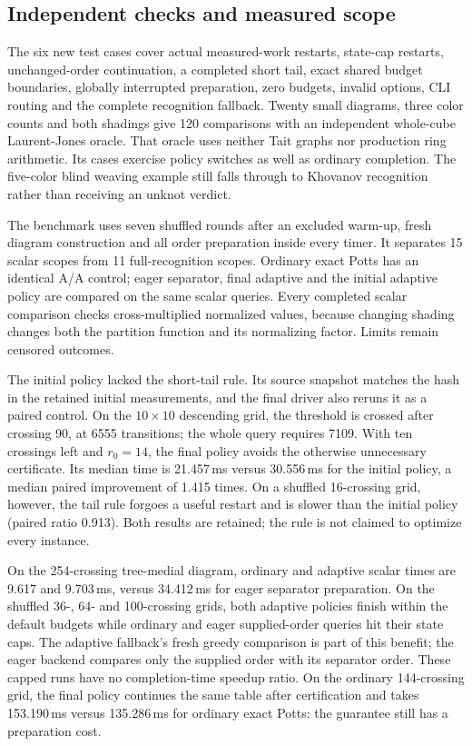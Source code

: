 \subsection{Independent checks and measured scope}

The six new test cases cover actual measured-work restarts, state-cap
restarts, unchanged-order continuation, a completed short tail, exact shared
budget boundaries, globally interrupted preparation, zero budgets, invalid
options, CLI routing and the complete recognition fallback.  Twenty small
diagrams, three color counts and both shadings give 120 comparisons with an
independent whole-cube Laurent-Jones oracle.  That oracle uses neither Tait
graphs nor production ring arithmetic.  Its cases exercise policy switches
as well as ordinary completion.  The five-color blind weaving example still
falls through to Khovanov recognition rather than receiving an unknot verdict.

The benchmark uses seven shuffled rounds after an excluded warm-up, fresh
diagram construction and all order preparation inside every timer.  It
separates 15 scalar scopes from 11 full-recognition scopes.  Ordinary exact
Potts has an identical A/A control; eager separator, final adaptive and the
initial adaptive policy are compared on the same scalar queries.  Every
completed scalar comparison checks cross-multiplied normalized values,
because changing shading changes both the partition function and its
normalizing factor.  Limits remain censored outcomes.

The initial policy lacked the short-tail rule.  Its source snapshot matches
the hash in the retained initial measurements, and the final driver also
reruns it as a paired control.  On the $10\times10$ descending grid, the
threshold is crossed after crossing 90, at 6555 transitions; the whole query
requires 7109.  With ten crossings left and $r_0=14$, the final policy avoids
the otherwise unnecessary certificate.  Its median time is 21.457\,ms versus
30.556\,ms for the initial policy, a median paired improvement of 1.415 times.
On a shuffled 16-crossing grid, however, the tail rule forgoes a useful restart
and is slower than the initial policy (paired ratio 0.913).  Both results are
retained; the rule is not claimed to optimize every instance.



On the 254-crossing tree-medial diagram, ordinary and adaptive scalar times
are 9.617 and 9.703\,ms, versus 34.412\,ms for eager separator preparation.
On the shuffled 36-, 64- and 100-crossing grids, both adaptive policies finish
within the default budgets while ordinary and eager supplied-order queries
hit their state caps.  The adaptive fallback's fresh greedy comparison is
part of this benefit; the eager backend compares only the supplied order
with its separator order.  These capped runs have no completion-time speedup
ratio.  On the ordinary 144-crossing grid, the final policy continues the
same table after certification and takes 153.190\,ms versus 135.286\,ms for
ordinary exact Potts: the guarantee still has a preparation cost.

